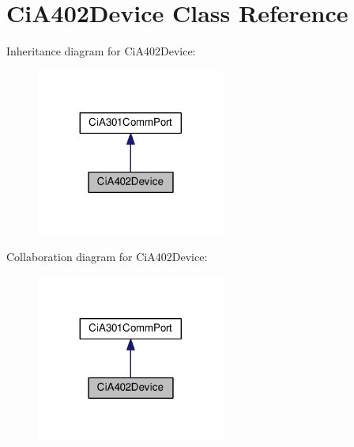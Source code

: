 \hypertarget{classCiA402Device}{}\section{Ci\+A402\+Device Class Reference}
\label{classCiA402Device}


Inheritance diagram for Ci\+A402\+Device\+:
\nopagebreak
\begin{figure}[H]
\begin{center}
\leavevmode
\includegraphics[width=176pt]{classCiA402Device__inherit__graph}
\end{center}
\end{figure}


Collaboration diagram for Ci\+A402\+Device\+:
\nopagebreak
\begin{figure}[H]
\begin{center}
\leavevmode
\includegraphics[width=176pt]{classCiA402Device__coll__graph}
\end{center}
\end{figure}
